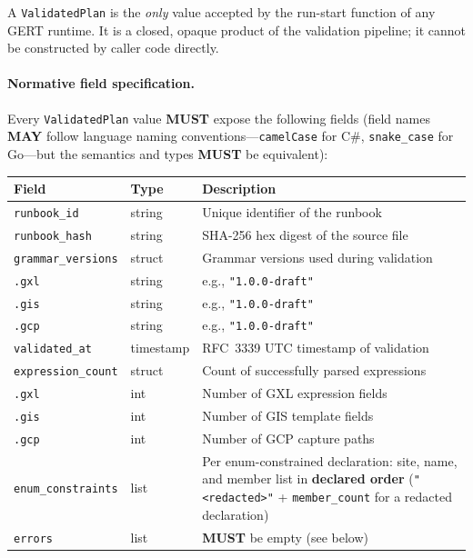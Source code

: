 A \texttt{ValidatedPlan} is the \emph{only} value accepted by the run-start
function of any GERT runtime.  It is a closed, opaque product of the validation
pipeline; it cannot be constructed by caller code directly.

\paragraph{Normative field specification.}
Every \texttt{ValidatedPlan} value \textbf{MUST} expose the following fields
(field names \textbf{MAY} follow language naming conventions---\texttt{camelCase}
for C\#, \texttt{snake\_case} for Go---but the semantics and types \textbf{MUST}
be equivalent):

\begin{center}
\begin{tabular}{lll}
\hline
\textbf{Field} & \textbf{Type} & \textbf{Description} \\
\hline
\texttt{runbook\_id}      & string    & Unique identifier of the runbook \\
\texttt{runbook\_hash}    & string    & SHA-256 hex digest of the source file \\
\texttt{grammar\_versions}& struct    & Grammar versions used during validation \\
\quad\texttt{.gxl}        & string    & e.g., \texttt{"1.0.0-draft"} \\
\quad\texttt{.gis}        & string    & e.g., \texttt{"1.0.0-draft"} \\
\quad\texttt{.gcp}        & string    & e.g., \texttt{"1.0.0-draft"} \\
\texttt{validated\_at}    & timestamp & RFC~3339 UTC timestamp of validation \\
\texttt{expression\_count}& struct    & Count of successfully parsed expressions \\
\quad\texttt{.gxl}        & int       & Number of GXL expression fields \\
\quad\texttt{.gis}        & int       & Number of GIS template fields \\
\quad\texttt{.gcp}        & int       & Number of GCP capture paths \\
\texttt{enum\_constraints}& list      & Per enum-constrained declaration: site, name, and member list in \textbf{declared order} (\texttt{"<redacted>"} + \texttt{member\_count} for a redacted declaration) \\
\texttt{errors}           & list      & \textbf{MUST} be empty (see below) \\
\hline
\end{tabular}
\end{center}

